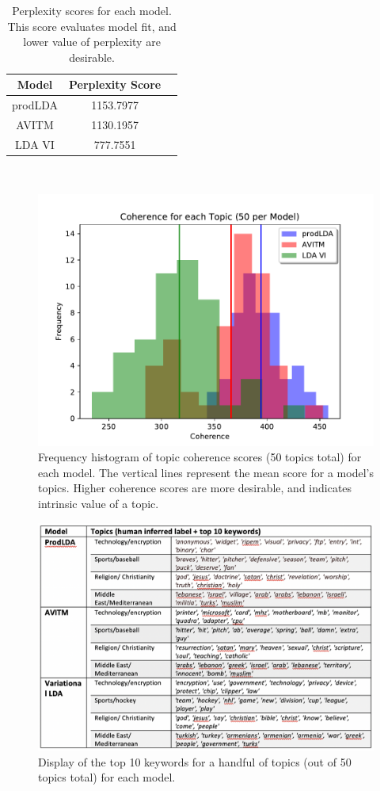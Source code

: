 \documentclass[10pt,twocolumn,letterpaper]{article}
\begin{document}
\begin{table}\label{tab:perp}
\centering
\begin{tabular}{ |c|c|c| } 
\hline
\textbf{Model} & \textbf{Perplexity Score} \\
\hline
prodLDA & 1153.7977  \\ 
AVITM & 1130.1957  \\ 
LDA VI & 777.7551  \\ 
\hline
\end{tabular}\\
\caption{Perplexity scores for each model. This score evaluates model fit, and lower value of perplexity are desirable.}
\end{table}

\begin{figure}[t]
\begin{center}
   \includegraphics[width=0.8\linewidth]{coherence.pdf}
\end{center}
   \caption{Frequency histogram of topic coherence scores (50 topics total) for each model. 
   The vertical lines represent the mean score for a model's topics.
   Higher coherence scores are more desirable, and indicates intrinsic value of a topic.}
\label{fig:coher}
\end{figure}

\begin{figure}
\begin{center}
\includegraphics[width=1\linewidth]{qualitative-summary.png}
\end{center}
   \caption{Display of the top 10 keywords for a handful of topics (out of 50 topics total) for each model.}
\label{fig:qual}
\end{figure}
\end{document}
